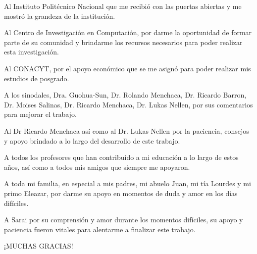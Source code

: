 \begin{acknowledgements}
\addchaptertocentry{\acknowledgementname} 

Al Instituto Politécnico Nacional que me recibió con las puertas abiertas y me mostró la grandeza de la institución. 

Al Centro de Investigación en Computación, por darme la oportunidad de formar parte de su comunidad y brindarme los recursos necesarios para poder realizar esta investigación.

Al CONACYT, por el apoyo económico que se me asignó para poder realizar mis estudios de posgrado.

A los sinodales, Dra. Guohua-Sun, Dr. Rolando Menchaca, Dr. Ricardo Barron, Dr. Moises Salinas, Dr. Ricardo Menchaca, Dr. Lukas Nellen, por sus comentarios para mejorar el trabajo.

Al Dr Ricardo Menchaca así como al Dr. Lukas Nellen por la paciencia, consejos y apoyo brindado a lo largo del desarrollo de este trabajo.

A todos los profesores que han contribuido a mi educación a lo largo de estos años, así como a todos mis amigos que siempre me apoyaron.  

A toda mi familia, en especial a mis padres, mi abuelo Juan, mi tía Lourdes y mi primo Eleazar, por darme su apoyo en momentos de duda y amor en los días difíciles.

A Sarai por su comprensión y amor durante los momentos difíciles, su apoyo y paciencia fueron vitales para alentarme a finalizar este trabajo. 

¡MUCHAS GRACIAS!

\end{acknowledgements}

\pagebreak